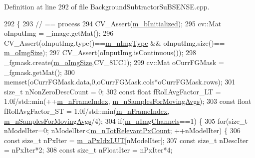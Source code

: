 Definition at line 292 of file Background\+Subtractor\+Su\+B\+S\+E\+N\+S\+E.\+cpp.


\begin{DoxyCode}
292                                                                                                            
                \{
293     \textcolor{comment}{// == process}
294     CV\_Assert(\mbox{\hyperlink{class_background_subtractor_l_b_s_p_a55cea104a0924fd50d5bed0912828a7e}{m\_bInitialized}});
295     cv::Mat oInputImg = \_image.getMat();
296     CV\_Assert(oInputImg.type()==\mbox{\hyperlink{class_background_subtractor_l_b_s_p_a7d2f52ecd5ff56e42da86f97e0ad93b5}{m\_nImgType}} && oInputImg.size()==
      \mbox{\hyperlink{class_background_subtractor_l_b_s_p_a732d5e6ae35fb0e858cadb3af5ce08a2}{m\_oImgSize}});
297     CV\_Assert(oInputImg.isContinuous());
298     \_fgmask.create(\mbox{\hyperlink{class_background_subtractor_l_b_s_p_a732d5e6ae35fb0e858cadb3af5ce08a2}{m\_oImgSize}},CV\_8UC1);
299     cv::Mat oCurrFGMask = \_fgmask.getMat();
300     memset(oCurrFGMask.data,0,oCurrFGMask.cols*oCurrFGMask.rows);
301     \textcolor{keywordtype}{size\_t} nNonZeroDescCount = 0;
302     \textcolor{keyword}{const} \textcolor{keywordtype}{float} fRollAvgFactor\_LT = 1.0f/std::min(++\mbox{\hyperlink{class_background_subtractor_l_b_s_p_a8a2350cad84f19c68ef61b7aaf91c43f}{m\_nFrameIndex}},
      \mbox{\hyperlink{class_background_subtractor_su_b_s_e_n_s_e_acd112ccb067f76e370400565fa09ee49}{m\_nSamplesForMovingAvgs}});
303     \textcolor{keyword}{const} \textcolor{keywordtype}{float} fRollAvgFactor\_ST = 1.0f/std::min(\mbox{\hyperlink{class_background_subtractor_l_b_s_p_a8a2350cad84f19c68ef61b7aaf91c43f}{m\_nFrameIndex}},
      \mbox{\hyperlink{class_background_subtractor_su_b_s_e_n_s_e_acd112ccb067f76e370400565fa09ee49}{m\_nSamplesForMovingAvgs}}/4);
304     \textcolor{keywordflow}{if}(\mbox{\hyperlink{class_background_subtractor_l_b_s_p_ab3467ebee2c5d1249061ccd704cc0584}{m\_nImgChannels}}==1) \{
305         \textcolor{keywordflow}{for}(\textcolor{keywordtype}{size\_t} nModelIter=0; nModelIter<\mbox{\hyperlink{class_background_subtractor_l_b_s_p_ac3b54f4d2dfa3a576475214f26501d85}{m\_nTotRelevantPxCount}}; ++nModelIter) \{
306             \textcolor{keyword}{const} \textcolor{keywordtype}{size\_t} nPxIter = \mbox{\hyperlink{class_background_subtractor_l_b_s_p_a06b4f0d3f24fa08bccd3c9eca085713e}{m\_aPxIdxLUT}}[nModelIter];
307             \textcolor{keyword}{const} \textcolor{keywordtype}{size\_t} nDescIter = nPxIter*2;
308             \textcolor{keyword}{const} \textcolor{keywordtype}{size\_t} nFloatIter = nPxIter*4;

\end{DoxyCode}
